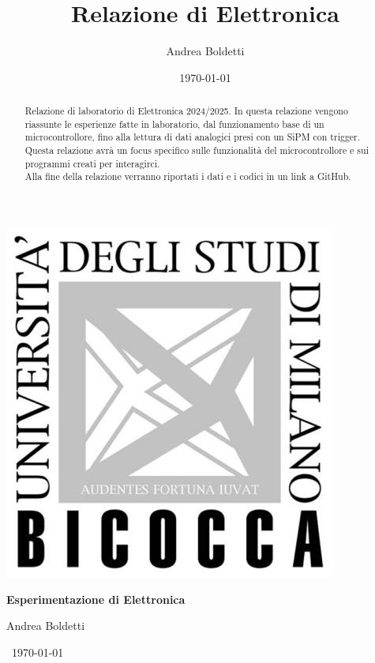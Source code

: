 \documentclass[a4paper]{article}
\title{Relazione di Elettronica}
\author{Andrea Boldetti}
\date{\today}
\begin{document}
\includegraphics[left]{Logo Bicocca.jpeg}

\begin{center}
        {\fontsize{23pt}{23pt}\selectfont\bfseries{}\selectfont Esperimentazione di Elettronica \par}
        \vspace{1cm} %
        {\fontsize{17pt}{22pt}\selectfont{}\selectfont Andrea Boldetti \par}

        \vspace{1cm}
        {\centering\fontsize{20pt}{20pt}\selectfont{}\selectfont \ \today \par}
\end{center}
 \vspace{5cm}

\begin{abstract}
Relazione di laboratorio di Elettronica 2024/2025. In questa relazione vengono riassunte le esperienze fatte in laboratorio, dal funzionamento base di un microcontrollore, fino alla lettura di dati analogici presi con un SiPM con trigger.\\
Questa relazione avrà un focus specifico sulle funzionalità del microcontrollore e sui programmi creati per interagirci.\\
Alla fine della relazione verranno riportati i dati e i codici in un link a GitHub.
\end{abstract}

\newpage
{
    \hypersetup{linkcolor=black}
    \tableofcontents
}
\newpage







\end{document}

